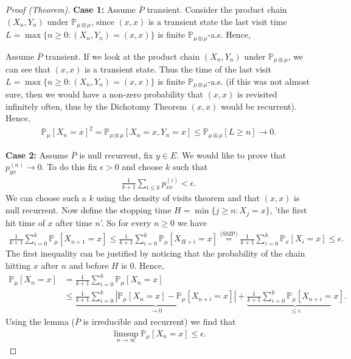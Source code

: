 \begin{proof}[Proof (Theorem)]
	\textbf{Case 1:} 
	Assume $\overline{P}$ transient. Consider the product chain $(X_n, Y_n)$ under $\mathbb{P}_{\mu \otimes \mu }$, since $(x,x)$ is a transient state the last visit time $L=\max\{n\geq 0: (X_n, Y_n)=(x,x)\}$ is finite $\mathbb{P}_{\mu \otimes \mu}$-a.s. Hence,

	{\color{blue}
	Assume $\overline{P}$ transient. If we look at the product chain $(X_n, Y_n)$ under $\mathbb{P}_{\mu \otimes \mu}$, we can see that $(x,x)$ is a transient state. Thus the time of the last visit  $L = \max\{n\geq 0: (X_n, Y_n) = (x,x) \}$ is finite $\mathbb{P}_{\mu \otimes \mu}$-a.s. (if this was not almost sure, then we would have a non-zero probability that $(x,x)$ is revisited infinitely often, thus by the Dichotomy Theorem $(x,x)$ would be recurrent). Hence, 
}
\begin{align}
	\mathbb{P}_{\mu } \left[ X_n = x \right]^2 = \mathbb{P}_{\mu \otimes \mu} \left[ X_n =x, Y_n=x \right] \leq \mathbb{P}_{\mu \otimes \mu } \left[ L \geq n \right] \to 0.
\end{align}

\textbf{Case 2:} Assume $\overline{P}$ is null recurrent, fix  $y \in E$. We would like to prove that $p_{yx}^{(n)} \to 0$. To do this fix $\epsilon > 0$ and choose $k$ such that
\begin{align}
	\frac{1}{k+1} \sum_{i\leq k}^{} p_{xx}^{(i)} < \epsilon.
\end{align}
{\color{blue}We can choose such a $k$ using the density of visits theorem and that $(x,x)$ is null recurrent.} Now define the stopping time $H = \min\{j \geq n: X_j = x\}${\color{blue}, 'the first hit time of $x$ after time $n$'}. So for every $n\geq 0$ we have
\begin{align}
	\frac{1}{k+1} \sum_{i=0}^{k} \mathbb{P}_{\mu } \left[ X_{n+1}=x \right]  \leq \frac{1}{k+1} \sum_{i=0}^{k} \mathbb{P}_{\mu } \left[ X_{H+i}=x \right]  
	\stackrel{\textrm{(SMP)}}{=} \frac{1}{k+1} \sum_{i=0}^{k} \mathbb{P}_{x} \left[ X_i =x \right]  \leq \epsilon.
\end{align}
{\color{blue}The first inequality can be justified by noticing that the probability of the chain hitting $x$ after $n$ and before $ H$ is 0.} Hence,
\begin{align}
	\mathbb{P}_{\mu } \left[ X_n = x \right] &= \frac{1}{k+1} \sum_{i=0}^{k} \mathbb{P}_{\mu } \left[ X_n = x \right] \\
						 &\leq \underbrace{\frac{1}{k+1}\sum_{i=0}^{k} \left| \mathbb{P}_{\mu } \left[ X_n = x \right] - \mathbb{P}_{\mu } \left[ X_{n+i} = x \right] \right|}_{\to 0} + \underbrace{\frac{1}{k+1} \sum_{i=0}^{k} \mathbb{P}_{\mu } \left[ X_{n+i}=x \right]}_{\leq \epsilon} 
.\end{align}
Using the lemma ($\overline{P}$ is irreducible and recurrent) we find that
\begin{align}
	\limsup_{n\to\infty} \mathbb{P}_{\mu } \left[ X_n = x \right] \leq \epsilon.
\end{align}
\end{proof}

